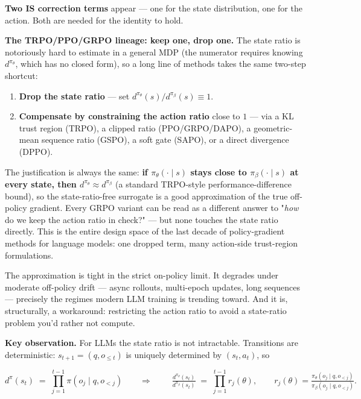 \documentclass[11pt,a4paper]{article}
\theoremstyle{remark}
\begin{document}
\textbf{Two IS correction terms} appear --- one for the state distribution, one for the action. Both are needed for the identity to hold.

\textbf{The TRPO/PPO/GRPO lineage: keep one, drop one.} The state ratio is notoriously hard to estimate in a general MDP (the numerator requires knowing $d^{\pi_\theta}$, which has no closed form), so a long line of methods takes the same two-step shortcut:

\begin{enumerate}[leftmargin=1.2em]
\item \textbf{Drop the state ratio} --- set $d^{\pi_\theta}(s)/d^{\pi_\beta}(s)\equiv 1$.
\item \textbf{Compensate by constraining the action ratio} close to $1$ --- via a KL trust region (TRPO), a clipped ratio (PPO/GRPO/DAPO), a geometric-mean sequence ratio (GSPO), a soft gate (SAPO), or a direct divergence (DPPO).
\end{enumerate}

The justification is always the same: \textbf{if $\pi_\theta(\cdot\mid s)$ stays close to $\pi_\beta(\cdot\mid s)$ at every state, then $d^{\pi_\theta}\approx d^{\pi_\beta}$} (a standard TRPO-style performance-difference bound), so the state-ratio-free surrogate is a good approximation of the true off-policy gradient. Every GRPO variant can be read as a different answer to "\emph{how} do we keep the action ratio in check?" --- but none touches the state ratio directly. This is the entire design space of the last decade of policy-gradient methods for language models: one dropped term, many action-side trust-region formulations.

The approximation is tight in the strict on-policy limit. It degrades under moderate off-policy drift --- async rollouts, multi-epoch updates, long sequences --- precisely the regimes modern LLM training is trending toward. And it is, structurally, a workaround: restricting the action ratio to avoid a state-ratio problem you'd rather not compute.

\textbf{Key observation.} For LLMs the state ratio is not intractable. Transitions are deterministic: $s_{t+1}=(q,o_{\le t})$ is uniquely determined by $(s_t,a_t)$, so


\begin{equation*}
d^{\pi}(s_t) \;=\; \prod_{j=1}^{t-1}\pi(o_j\mid q, o_{<j})
\qquad\Longrightarrow\qquad
\boxed{\;\tfrac{d^{\pi_\theta}(s_t)}{d^{\pi_\beta}(s_t)} \;=\; \prod_{j=1}^{t-1} r_j(\theta),\qquad r_j(\theta)=\tfrac{\pi_\theta(o_j\mid q, o_{<j})}{\pi_\beta(o_j\mid q, o_{<j})}.\;}
\end{equation*}
\end{document}
